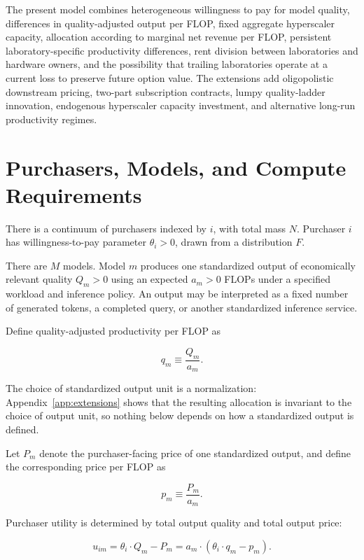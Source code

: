 \documentclass[11pt]{article}
\begin{document}
The present model combines heterogeneous willingness to pay for model quality, differences in quality-adjusted output per FLOP, fixed aggregate hyperscaler capacity, allocation according to marginal net revenue per FLOP, persistent laboratory-specific productivity differences, rent division between laboratories and hardware owners, and the possibility that trailing laboratories operate at a current loss to preserve future option value. The extensions add oligopolistic downstream pricing, two-part subscription contracts, lumpy quality-ladder innovation, endogenous hyperscaler capacity investment, and alternative long-run productivity regimes.

\section{Purchasers, Models, and Compute Requirements}
\label{sec:basic-setup}

There is a continuum of purchasers indexed by $i$, with total mass $N$. Purchaser $i$ has willingness-to-pay parameter $\theta_i>0$, drawn from a distribution $F$.

There are $M$ models. Model $m$ produces one standardized output of economically relevant quality $Q_m>0$ using an expected $a_m>0$ FLOPs under a specified workload and inference policy. An output may be interpreted as a fixed number of generated tokens, a completed query, or another standardized inference service.

Define quality-adjusted productivity per FLOP as

\begin{equation}q_m\equiv\frac{Q_m}{a_m}.\end{equation}

The choice of standardized output unit is a normalization: Appendix~\ref{app:extensions} shows that the resulting allocation is invariant to the choice of output unit, so nothing below depends on how a standardized output is defined.

Let $P_m$ denote the purchaser-facing price of one standardized output, and define the corresponding price per FLOP as

\begin{equation}p_m\equiv\frac{P_m}{a_m}.\end{equation}

Purchaser utility is determined by total output quality and total output price:

\begin{equation}u_{im}=\theta_i\cdot Q_m-P_m=a_m\cdot\left(\theta_i\cdot q_m-p_m\right).\end{equation}
\end{document}
